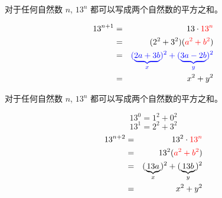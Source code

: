 
\begin{frame}{}
  \begin{theorem}
    对于任何自然数 $n$, $13^{n}$ 都可以写成两个自然数的平方之和。
  \end{theorem}

  \begin{eqnarray*}
    13^{n+1} &=& 13 \cdot \textcolor{red}{13^n} \\
    &=& (2^2+3^2)(\textcolor{red}{a^2 + b^2}) \\
    &=& \textcolor{blue}{(\underbrace{2a+3b}_x)^2 + (\underbrace{3a-2b}_y)^2} \\
    &=& x^2+y^2
  \end{eqnarray*}
\end{frame}

\begin{frame}{}
  \begin{theorem}
    对于任何自然数 $n$, $13^{n}$ 都可以写成两个自然数的平方之和。
  \end{theorem}

  \pause
  \[
    13^0 = 1^2 + 0^2
  \]
  \pause
  \[
    13^1 = 2^2 + 3^2
  \]
  \pause
  \begin{eqnarray*}
    13^{n+2} &=& 13^2\cdot \textcolor{red}{13^n} \\
    &=& 13^2(\textcolor{red}{a^2 + b^2}) \\
    &=& (\underbrace{13a}_x)^2 + (\underbrace{13b}_y)^2 \\
    &=& x^2+y^2
  \end{eqnarray*}
\end{frame}

%
%

